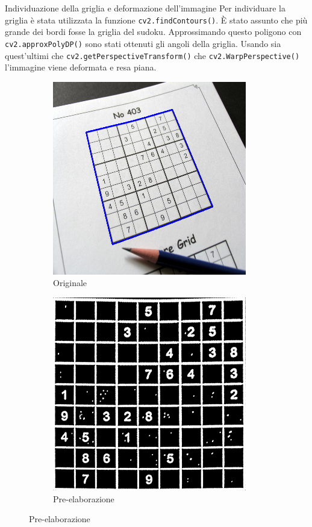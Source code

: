 \documentclass[10pt]{beamer}
\begin{document}
\begin{frame}[fragile]{Individuazione della griglia e deformazione dell'immagine}
    Per individuare la griglia è stata utilizzata la funzione \verb|cv2.findContours()|. È stato assunto che più grande dei bordi fosse la griglia
    del sudoku. Approssimando questo poligono con \verb|cv2.approxPolyDP()| sono stati ottenuti gli angoli della griglia. Usando sia
    quest'ultimi che \verb|cv2.getPerspectiveTransform()| che \verb|cv2.WarpPerspective()| l'immagine viene deformata e resa piana.

    \begin{figure}[h]
        \def\subwidth{0.50}
        \def\imgwidth{0.70}
        \centering
        \begin{subfigure}[b]{\subwidth\linewidth}
            \centering
            \includegraphics[width=\imgwidth\linewidth]{imgs/grid.png}
            \caption{Originale}\label{subfig:grid}
        \end{subfigure}%
        \begin{subfigure}[b]{\subwidth\linewidth}
            \centering
            \includegraphics[width=\imgwidth\linewidth]{imgs/warp.png}
            \caption{Pre-elaborazione}\label{subfig:warp}
        \end{subfigure}
    \end{figure}
\end{frame}
\end{document}
